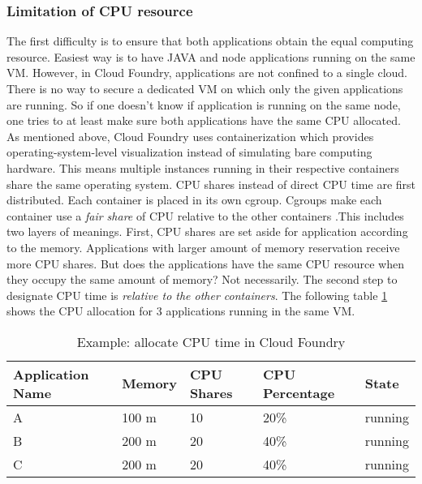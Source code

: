 \subsubsection{Limitation of CPU resource}
\label{cpu limitation}
The first difficulty is to ensure that both applications obtain the equal computing resource. Easiest way is to have JAVA and node applications running on the same VM. However, in Cloud Foundry, applications are not confined to a single cloud. There is no way to secure a dedicated VM on which only the given applications are running. So if one doesn't know if application is running on the same node, one tries to at least make sure both applications have the same CPU allocated. As mentioned above, Cloud Foundry uses containerization which provides operating-system-level visualization instead of simulating bare computing hardware. This means multiple instances running in their respective containers share the same operating system. CPU shares instead of direct CPU time are first distributed. Each container is placed in its own cgroup. Cgroups make each container use a \textit{fair share} of CPU relative to the other containers \citep{CGroup}.This includes two layers of meanings. First, CPU shares are set aside for application according to the memory. Applications with larger amount of memory reservation receive more CPU shares. But does the applications have the same CPU resource when they occupy the same amount of memory? Not necessarily. The second step to designate CPU time is \textit{relative to the other containers}. The following table \ref{CPU time in Cloud Foundry} shows the CPU allocation for 3 applications running in the same VM. 
\begin{table}[h]
	\caption{Example: allocate CPU time in Cloud Foundry}
	\label{CPU time in Cloud Foundry}
	\renewcommand{\arraystretch}{1.2}
	\centering
	\sffamily
	\begin{footnotesize}
		\begin{tabular}{l l l l l }
			\toprule
			\textbf{Application Name} & \textbf{Memory} & \textbf{CPU Shares}& \textbf{CPU Percentage} }& \textbf{State}\\
			\midrule
		    A 	&	100	m & 10 & 20\%   & running\\
			B	&	200 m & 20 & 40\% & running\\
			C	&	200 m &	20 & 40\% & running\\
			\bottomrule
		\end{tabular}
	\end{footnotesize}
	\rmfamily
\end{table}

